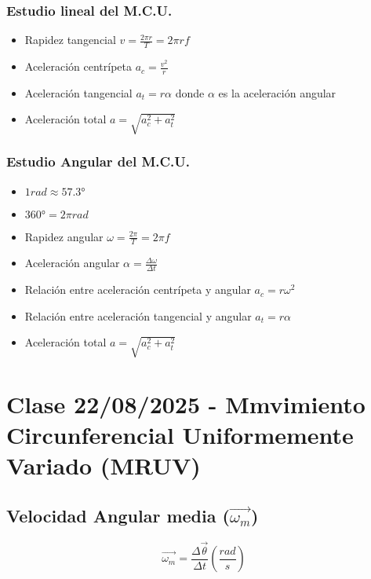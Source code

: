 \documentclass[11pt]{article}
\begin{document}
\subsubsection{Estudio lineal del M.C.U.}
\begin{itemize}
	\item Rapidez tangencial $v = \frac{2\pi r}{T} = 2\pi rf $
	\item Aceleración centrípeta $a_c = \frac{v^2}{r} $
	\item Aceleración tangencial $a_t = r\alpha$ donde $\alpha$ es la aceleración angular
	\item Aceleración total $a = \sqrt{a_c^2 + a_t^2}$
\end{itemize}

\subsubsection{Estudio Angular del M.C.U.}
\begin{itemize}
	\item $1 rad \approx 57.3° $
	\item $360° = 2\pi rad$
	\item Rapidez angular $\omega = \frac{2\pi}{T} = 2\pi f$
	\item Aceleración angular $\alpha = \frac{\Delta \omega}{\Delta t}$
	\item Relación entre aceleración centrípeta y angular $a_c = r\omega^2$
	\item Relación entre aceleración tangencial y angular $a_t = r\alpha$
	\item Aceleración total $a = \sqrt{a_c^2 + a_t^2} $
\end{itemize}


\newpage


\section{Clase 22/08/2025 - Mmvimiento Circunferencial Uniformemente Variado (MRUV)}
\subsection{Velocidad Angular media ($\vec{\omega_m} $)}

\begin{minipage}{0.45\textwidth}
	\begin{flushleft}
        \[\vec{\omega_m}= \frac{\Delta \vec{\theta}}{\Delta t} (\frac{rad}{s}) \]
	\end{flushleft}
\end{minipage}
\begin{minipage}{0.45\textwidth}
	\begin{flushleft}

	\end{flushleft}
\end{minipage}
\end{document}
